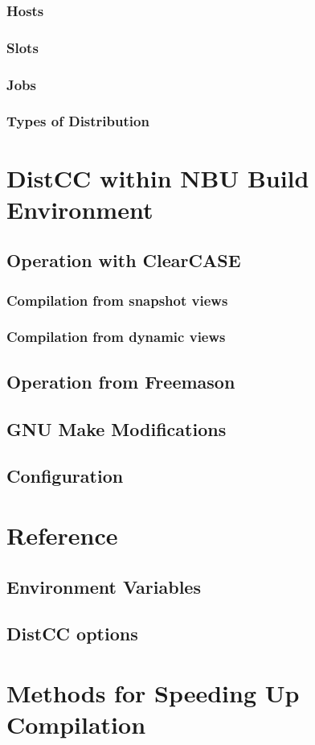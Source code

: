 \documentclass[a4paper]{book}
\begin{document}
\subsection{Hosts}
\subsection{Slots}
\subsection{Jobs}
\subsection{Types of Distribution}


\chapter{DistCC within NBU Build Environment}

\section{Operation with ClearCASE}
\subsection{Compilation from snapshot views}
\subsection{Compilation from dynamic views}
\section{Operation from Freemason}
\section{GNU Make Modifications}
\section{Configuration}

\chapter{Reference}

\section{Environment Variables}
\section{DistCC options}

\appendix
\chapter{Methods for Speeding Up Compilation}

\end{document}
